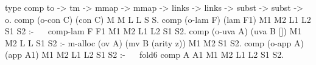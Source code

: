   type comp to -> tm -> mmap -> mmap -> links -> links ->
    subst -> subst -> o.
  comp (o-con C) (con C) M M L L S S.
  comp (o-lam F) (lam F1) M1 M2 L1 L2 S1 S2 :-            ~~
    comp-lam F F1 M1 M2 L1 L2 S1 S2.
  comp (o-uva A) (uva B []) M1 M2 L L S1 S2 :- 
    m-alloc (ov A) (mv B (arity z)) M1 M2 S1 S2.
  comp (o-app A) (app A1) M1 M2 L1 L2 S1 S2 :-            ~~
    fold6 comp A A1 M1 M2 L1 L2 S1 S2.
